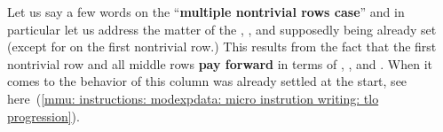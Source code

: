 \saNote{} Let us say a few words on the ``\textbf{multiple nontrivial rows case}'' and in particular let us address the matter of the 
\microSlo, \microSbo, \microTlo{} and \microTbo{} supposedly being already set (except for on the first nontrivial row.)
This results from the fact that the first nontrivial row and all middle rows \textbf{pay forward} in terms of \microSlo, \microSbo, and \microTbo{}.
When it comes to \microTlo{} the behavior of this column was already settled at the start, see here~(\ref{mmu: instructions: modexpdata: micro instrution writing: tlo progression}).
